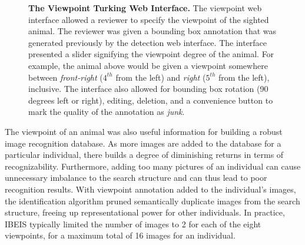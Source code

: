 \begin{figure}[t]%
    \centering
        \caption[The Viewpoint Turking Web Interface]{\textbf{The Viewpoint Turking Web Interface.}  The viewpoint web interface allowed a reviewer to specify the viewpoint of the sighted animal.  The reviewer was given a bounding box annotation that was generated previously by the detection web interface.  The interface presented a slider signifying the viewpoint degree of the animal.  For example, the animal above would be given a viewpoint somewhere between \textit{front-right} ($4^{th}$ from the left) and \textit{right} ($5^{th}$ from the left), inclusive.  The interface also allowed for bounding box rotation (90 degrees left or right), editing, deletion, and a convenience button to mark the quality of the annotation as \textit{junk}.}
        \label{fig:turking_interface_viewpoint}
\end{figure}

The viewpoint of an animal was also useful information for building a robust image recognition database.  As more images are added to the database for a particular individual, there builds a degree of diminishing returns in terms of recognizability.  Furthermore, adding too many pictures of an individual can cause unnecessary imbalance to the search structure and can thus lead to poor recognition results.  With viewpoint annotation added to the individual's images, the identification algorithm pruned semantically duplicate images from the search structure, freeing up representational power for other individuals.  In practice, IBEIS typically limited the number of images to 2 for each of the eight viewpoints, for a maximum total of 16 images for an individual.

